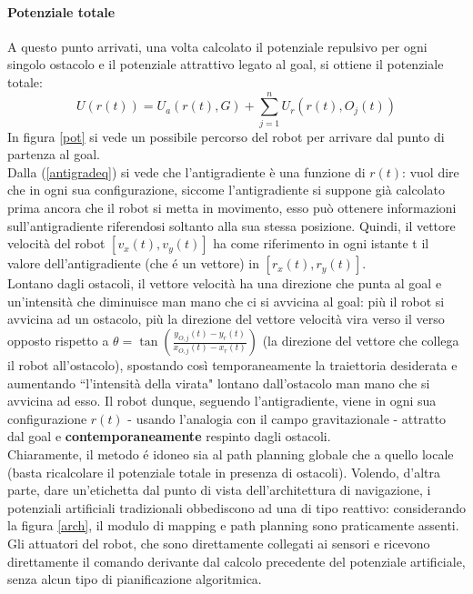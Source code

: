 \documentclass[14pt,a4paper]{extarticle}
\begin{document}
\paragraph{Potenziale totale}
A questo punto arrivati, una volta calcolato il potenziale repulsivo per ogni singolo ostacolo e il potenziale attrattivo legato al goal, si ottiene il potenziale totale:
\begin{equation}
\label{antigradeq}
U(r(t)) = U_a(r(t),G) + \sum_{j=1}^{n} U_r(r(t),O_j(t))
\end{equation}
In figura \ref{pot} si vede un possibile percorso del robot per arrivare dal punto di partenza al goal. \\
Dalla (\ref{antigradeq}) si vede che l'antigradiente è una funzione di \(r(t)\): vuol dire che in ogni sua configurazione, siccome l'antigradiente si suppone già calcolato prima ancora che il robot si metta in movimento, esso può ottenere informazioni sull'antigradiente riferendosi soltanto alla sua stessa posizione. Quindi, il vettore velocità del robot \([v_x(t) , v_y(t)]\) ha come riferimento in ogni istante t il valore dell'antigradiente (che é un vettore) in \([r_x(t),r_y(t)]\).\\
Lontano dagli ostacoli, il vettore velocità ha una direzione che punta al goal e un'intensità che diminuisce man mano che ci si avvicina al goal: più il robot si avvicina ad un ostacolo, più la direzione del vettore velocità vira verso il verso opposto rispetto a \(\theta = \tan \left( \frac{y_{O,j}(t)-y_r(t)}{x_{O,j}(t)-x_r(t)} \right) \) (la direzione del vettore che collega il robot all'ostacolo), spostando così temporaneamente la traiettoria desiderata e aumentando ``l'intensità della virata" lontano dall'ostacolo man mano che si avvicina ad esso. Il robot dunque, seguendo l'antigradiente, viene in ogni sua configurazione \(r(t)\) - usando l'analogia con il campo gravitazionale - attratto dal goal e \textbf{contemporaneamente} respinto dagli ostacoli.\\
Chiaramente, il metodo é idoneo sia al path planning globale che a quello locale (basta ricalcolare il potenziale totale in presenza di ostacoli). Volendo, d'altra parte, dare un'etichetta dal punto di vista dell'architettura di navigazione, i potenziali artificiali tradizionali obbediscono ad una di tipo reattivo: considerando la figura \ref{arch}, il modulo di mapping e path planning sono praticamente assenti. Gli attuatori del robot, che sono direttamente collegati ai sensori \cite{kim} e ricevono direttamente il comando derivante dal calcolo precedente del potenziale artificiale, senza alcun tipo di pianificazione algoritmica. 
\end{document}
